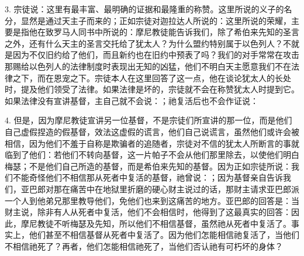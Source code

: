3. 宗徒说：这里有最丰富、最明确的证据和最隆重的称赞。这里所说的义子的名分，显然是通过天主子而来的；正如宗徒对迦拉达人所说的：这里所说的荣耀，主要是指他在致罗马人同书中所说的：摩尼教徒能告诉我们，除了希伯来先知的圣言之外，还有什么天主的圣言交托给了犹太人？为什么盟约特别属于以色列人？不就是因为不仅旧约给了他们，而且新约也在旧约中预表了吗？我们的对手常常在攻击那赐给以色列人的法律制度时表现出无知的凶猛，他们不明白天主愿意我们不在法律之下，而在恩宠之下。宗徒本人在这里回答了这一点，他在谈论犹太人的长处时，提及他们领受了法律。如果法律是坏的，宗徒就不会在称赞犹太人时提到它。如果法律没有宣讲基督，主自己就不会说：；祂复活后也不会作证说：\par

4. 但是，因为摩尼教徒宣讲另一位基督，不是宗徒们所宣讲的那一位，而是他们自己虚假捏造的假基督，效法这虚假的谎言，他们自己说谎言，虽然他们或许会被相信，因为他们不羞于自称是欺骗者的追随者，宗徒对不信的犹太人所断言的事就临到了他们：若他们不转向基督，这一片帕子不会从他们那里除去，以使他们明白梅瑟；不是他们自己所造的基督，而是希伯来先知的基督。因为正如宗徒所说：我们不能奇怪他们不相信那从死者中复活的基督，祂曾说：；因为基督亲自告诉我们，亚巴郎对那在痛苦中在地狱里折磨的硬心财主说过的话，那财主请求亚巴郎派一个人到他弟兄那里教导他们，免他们也来到这痛苦的地方。亚巴郎的回答是：当财主说，除非有人从死者中复活，他们不会相信时，他得到了这最真实的回答：因此，摩尼教徒不听梅瑟及先知，所以他们不相信基督，虽然祂从死者中复活了。事实上，他们甚至不相信基督从死者中复活了。因为他们怎能相信祂复活了，当他们不相信祂死了？再者，他们怎能相信祂死了，当他们否认祂有可朽坏的身体？\par

